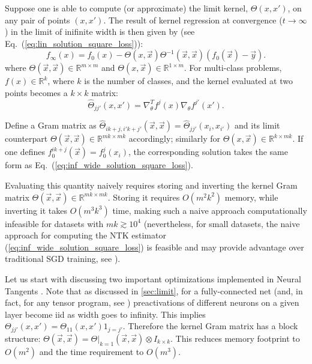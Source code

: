 \documentclass{article}
\newcommand{\RR}{\mathbb{R}}
\begin{document}
    Suppose one is able to compute (or approximate) the limit kernel, $\Theta(x,x')$, on any pair of points $(x,x')$.
    The result of kernel regression at convergence ($t \to \infty$) in the limit of inifinite width is then given by (see Eq.~(\ref{eq:lin_solution_square_loss})):
    \begin{equation}
        f_\infty(x) 
        = f_0(x) - \Theta(x, \vec x) \Theta^{-1}(\vec x, \vec x) (f_0(\vec x) - \vec y).
        \label{eq:inf_wide_solution_square_loss}
    \end{equation}
    where $\Theta(\vec x, \vec x) \in \RR^{m \times m}$ and $\Theta(x, \vec x) \in \RR^{1 \times m}$.
    For multi-class problems, $f(x) \in \RR^k$, where $k$ is the number of classes, and the kernel evaluated at two points becomes a $k \times k$ matrix:
    \begin{equation}
        \hat\Theta_{jj'}(x,x')
        = \nabla_\theta^T f^j(x) \nabla_\theta f^{j'}(x').
    \end{equation}

    Define a Gram matrix as $\hat\Theta_{ik+j,i'k+j'}(\vec x, \vec x) = \hat\Theta_{jj'}(x_i,x_{i'})$ and its limit counterpart $\Theta(\vec x, \vec x) \in \RR^{mk \times mk}$ accordingly; similarly for $\Theta(x, \vec x) \in \RR^{k \times mk}$.
    If one defines $f_0^{ik+j}(\vec x) = f_0^j(x_i)$, the corresponding solution takes the same form as Eq.~(\ref{eq:inf_wide_solution_square_loss}).

    Evaluating this quantity naively requires storing and inverting the kernel Gram matrix $\Theta(\vec x, \vec x) \in \RR^{mk \times mk}$.
    Storing it requires $O(m^2 k^2)$ memory, while inverting it takes $O(m^3 k^3)$ time, making such a naive approach computationally infeasible for datasets with $m k \gtrsim 10^4$ (nevertheless, for small datasets, the naive approach for computing the NTK estimator (\ref{eq:inf_wide_solution_square_loss}) is feasible and may provide advantage over traditional SGD training, see \cite{arora2019harnessing}).

    Let us start with discussing two important optimizations implemented in Neural Tangents \cite{novak2019neural}.
    Note that as discussed in \cref{sec:limit}, for a fully-connected net (and, in fact, for any tensor program, see \cite{yang2019tensor_i}) preactivations of different neurons on a given layer become iid as width goes to infinity.
    This implies $\Theta_{jj'}(x,x') = \Theta_{11}(x,x') 1_{j=j'}$.
    Therefore the kernel Gram matrix has a block structure: $\Theta(\vec x, \vec x) = \Theta|_{k=1}(\vec x, \vec x) \otimes I_{k \times k}$.
    This reduces memory footprint to $O(m^2)$ and the time requirement to $O(m^3)$.
\end{document}
